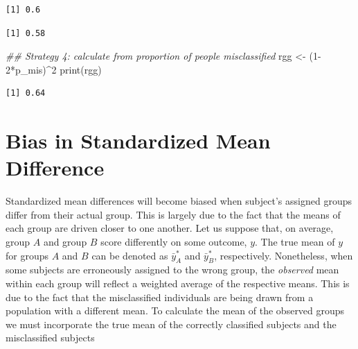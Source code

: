 \documentclass[
  letterpaper,
  DIV=11,
  numbers=noendperiod]{scrreprt}
\newenvironment{Shaded}{\begin{snugshade}}{\end{snugshade}}
\newcommand{\DecValTok}[1]{\textcolor[rgb]{0.68,0.00,0.00}{#1}}
\newcommand{\DocumentationTok}[1]{\textcolor[rgb]{0.37,0.37,0.37}{\textit{#1}}}
\newcommand{\FunctionTok}[1]{\textcolor[rgb]{0.28,0.35,0.67}{#1}}
\newcommand{\NormalTok}[1]{\textcolor[rgb]{0.00,0.23,0.31}{#1}}
\newcommand{\OtherTok}[1]{\textcolor[rgb]{0.00,0.23,0.31}{#1}}
\newcommand{\SpecialCharTok}[1]{\textcolor[rgb]{0.37,0.37,0.37}{#1}}
\begin{document}
\begin{verbatim}
[1] 0.6
\end{verbatim}

\begin{Shaded}
\end{Shaded}

\begin{verbatim}
[1] 0.58
\end{verbatim}

\begin{Shaded}
\begin{Highlighting}[]
\DocumentationTok{\#\# Strategy 4: calculate from proportion of people misclassified}
\NormalTok{rgg }\OtherTok{\textless{}{-}}\NormalTok{ (}\DecValTok{1{-}2}\SpecialCharTok{*}\NormalTok{p\_mis)}\SpecialCharTok{\^{}}\DecValTok{2}
\FunctionTok{print}\NormalTok{(rgg)}
\end{Highlighting}
\end{Shaded}

\begin{verbatim}
[1] 0.64
\end{verbatim}

\hypertarget{bias-in-standardized-mean-difference}{%
\section{Bias in Standardized Mean
Difference}\label{bias-in-standardized-mean-difference}}

Standardized mean differences will become biased when subject's assigned
groups differ from their actual group. This is largely due to the fact
that the means of each group are driven closer to one another. Let us
suppose that, on average, group \(A\) and group \(B\) score differently
on some outcome, \(y\). The true mean of \(y\) for groups \(A\) and
\(B\) can be denoted as \(\bar{y}^*_{A}\) and \(\bar{y}^*_{B}\),
respectively. Nonetheless, when some subjects are erroneously assigned
to the wrong group, the \emph{observed} mean within each group will
reflect a weighted average of the respective means. This is due to the
fact that the misclassified individuals are being drawn from a
population with a different mean. To calculate the mean of the observed
groups we must incorporate the true mean of the correctly classified
subjects and the misclassified subjects
\end{document}

